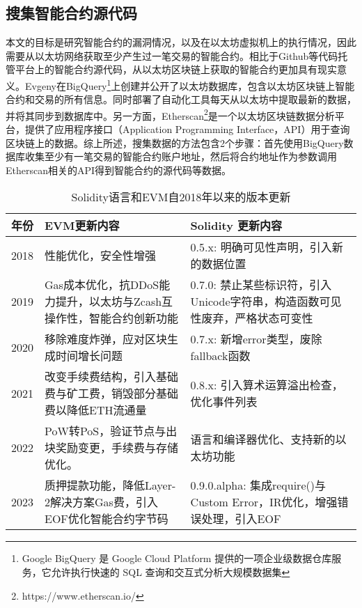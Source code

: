 \subsection{搜集智能合约源代码}
\label{sec:搜集智能合约源代码}
本文的目标是研究智能合约的漏洞情况，以及在以太坊虚拟机上的执行情况，因此需要从以太坊网络获取至少产生过一笔交易的智能合约。相比于Github等代码托管平台上的智能合约源代码，从以太坊区块链上获取的智能合约更加具有现实意义。Evgeny\cite{bigquery_ethereum}在BigQuery\footnote{Google BigQuery 是 Google Cloud Platform 提供的一项企业级数据仓库服务，它允许执行快速的 SQL 查询和交互式分析大规模数据集}上创建并公开了以太坊数据库，包含以太坊区块链上智能合约和交易的所有信息。同时部署了自动化工具每天从以太坊中提取最新的数据，并将其同步到数据库中。另一方面，Etherscan\footnote{https://www.etherscan.io/}是一个以太坊区块链数据分析平台，提供了应用程序接口（Application Programming Interface，API）用于查询区块链上的数据。综上所述，搜集数据的方法包含2个步骤：首先使用BigQuery数据库收集至少有一笔交易的智能合约账户地址，然后将合约地址作为参数调用Etherscan相关的API得到智能合约的源代码等数据。
\begin{table}[htbp]
    \caption{\label{tab:solidity_evm_update}Solidity语言和EVM自2018年以来的版本更新}
    \small
    \renewcommand{\arraystretch}{1.5}
    \begin{tabularx}{\linewidth}{p{1cm}p{7cm}<{\raggedright}X<{\raggedright}}
    \hline
    \textbf{年份} & \textbf{EVM更新内容} & \textbf{Solidity 更新内容} \\ \hline
    2018 & 性能优化，安全性增强 & 0.5.x: 明确可见性声明，引入新的数据位置 \\ \hline
    2019 & Gas成本优化，抗DDoS能力提升，以太坊与Zcash互操作性，智能合约创新功能 & 0.7.0: 禁止某些标识符，引入Unicode字符串，构造函数可见性废弃，严格状态可变性 \\ \hline
    2020 & 移除难度炸弹，应对区块生成时间增长问题 & 0.7.x: 新增error类型，废除fallback函数 \\ \hline
    2021 & 改变手续费结构，引入基础费与矿工费，销毁部分基础费以降低ETH流通量 & 0.8.x: 引入算术运算溢出检查，优化事件列表 \\ \hline
    2022 & PoW转PoS，验证节点与出块奖励变更，手续费与存储优化。 & 语言和编译器优化、支持新的以太坊功能 \\ \hline
    2023 & 质押提款功能，降低Layer-2解决方案Gas费，引入EOF优化智能合约字节码 & 0.9.0.alpha: 集成require()与Custom Error，IR优化，增强错误处理，引入EOF \\ \hline
    \end{tabularx}
    \end{table}
